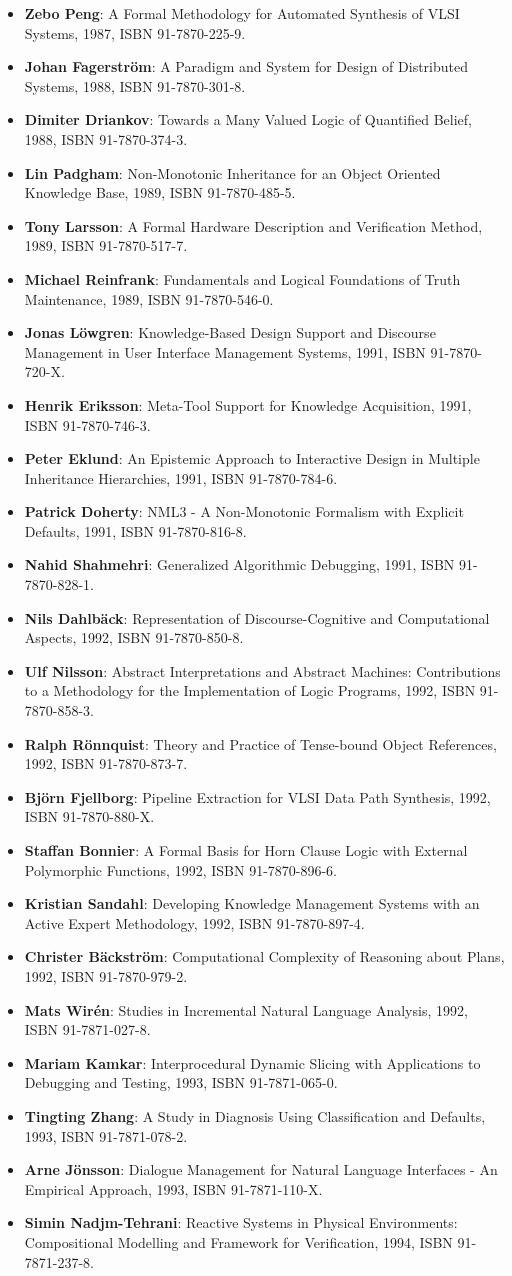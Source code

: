 \documentclass[a4paper,showtrims,twocolumn]{memoir}
\newenvironment{theses}
  {
    \begin{itemize}
      \setlength{\itemsep}{0.2em}
      \setlength{\parskip}{0em}
      \setlength{\parsep}{0em}
  }
  {
    \end{itemize}
  }
\newcommand{\thesis}[5]{\item[No. #1] \textbf{#2}: #3, #4, ISBN #5.}
\begin{document}
\begin{theses}
    \thesis{170}{Zebo Peng}{A Formal Methodology for Automated Synthesis of VLSI Systems}{1987}{91-7870-225-9}
    \thesis{174}{Johan Fagerström}{A Paradigm and System for Design of Distributed Systems}{1988}{91-7870-301-8}
    \thesis{192}{Dimiter Driankov}{Towards a Many Valued Logic of Quantified Belief}{1988}{91-7870-374-3}
    \thesis{213}{Lin Padgham}{Non-Monotonic Inheritance for an Object Oriented Knowledge Base}{1989}{91-7870-485-5}
    \thesis{214}{Tony Larsson}{A Formal Hardware Description and Verification Method}{1989}{91-7870-517-7}
    \thesis{221}{Michael Reinfrank}{Fundamentals and Logical Foundations of Truth Maintenance}{1989}{91-7870-546-0}
    \thesis{239}{Jonas Löwgren}{Knowledge-Based Design Support and Discourse Management in User Interface Management Systems}{1991}{91-7870-720-X}
    \thesis{244}{Henrik Eriksson}{Meta-Tool Support for Knowledge Acquisition}{1991}{91-7870-746-3}
    \thesis{252}{Peter Eklund}{An Epistemic Approach to Interactive Design in Multiple Inheritance Hierarchies}{1991}{91-7870-784-6}
    \thesis{258}{Patrick Doherty}{NML3 - A Non-Monotonic Formalism with Explicit Defaults}{1991}{91-7870-816-8}
    \thesis{260}{Nahid Shahmehri}{Generalized Algorithmic Debugging}{1991}{91-7870-828-1}
    \thesis{264}{Nils Dahlbäck}{Representation of Discourse-Cognitive and Computational Aspects}{1992}{91-7870-850-8}
    \thesis{265}{Ulf Nilsson}{Abstract Interpretations and Abstract Machines: Contributions to a Methodology for the Implementation of Logic Programs}{1992}{91-7870-858-3}
    \thesis{270}{Ralph Rönnquist}{Theory and Practice of Tense-bound Object References}{1992}{91-7870-873-7}
    \thesis{273}{Björn Fjellborg}{Pipeline Extraction for VLSI Data Path Synthesis}{1992}{91-7870-880-X}
    \thesis{276}{Staffan Bonnier}{A Formal Basis for Horn Clause Logic with External Polymorphic Functions}{1992}{91-7870-896-6}
    \thesis{277}{Kristian Sandahl}{Developing Knowledge Management Systems with an Active Expert Methodology}{1992}{91-7870-897-4}
    \thesis{281}{Christer Bäckström}{Computational Complexity of Reasoning about Plans}{1992}{91-7870-979-2}
    \thesis{292}{Mats Wirén}{Studies in Incremental Natural Language Analysis}{1992}{91-7871-027-8}
    \thesis{297}{Mariam Kamkar}{Interprocedural Dynamic Slicing with Applications to Debugging and Testing}{1993}{91-7871-065-0}
    \thesis{302}{Tingting Zhang}{A Study in Diagnosis Using Classification and Defaults}{1993}{91-7871-078-2}
    \thesis{312}{Arne Jönsson}{Dialogue Management for Natural Language Interfaces - An Empirical Approach}{1993}{91-7871-110-X}
    \thesis{338}{Simin Nadjm-Tehrani}{Reactive Systems in Physical Environments: Compositional Modelling and Framework for Verification}{1994}{91-7871-237-8}

\end{theses}
\end{document}
